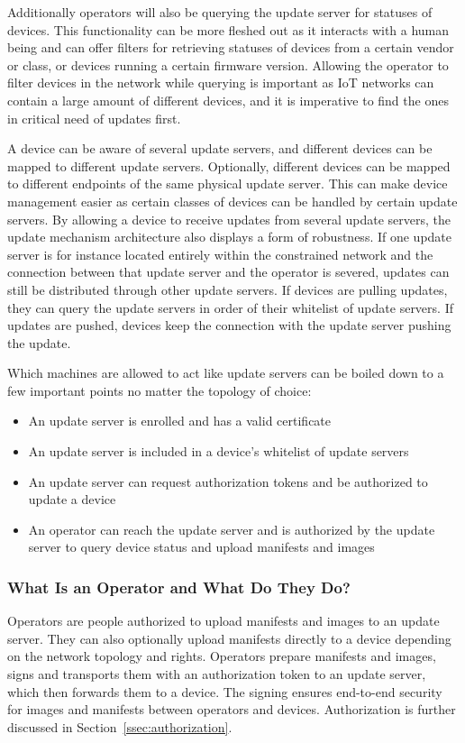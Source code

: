 \documentclass[0-thesis.tex]{subfiles}
\begin{document}
Additionally operators will also be querying the update server for statuses of devices.
This functionality can be more fleshed out as it interacts with a human being and can
offer filters for retrieving statuses of devices from a certain vendor or class, or
devices running a certain firmware version. Allowing the operator to filter devices in the
network while querying is important as IoT networks can contain a large amount of
different devices, and it is imperative to find the ones in critical need of updates
first.

A device can be aware of several update servers, and different devices can be mapped to
different update servers. Optionally, different devices can be mapped to different
endpoints of the same physical update server. This can make device management easier as
certain classes of devices can be handled by certain update servers. By allowing a device
to receive updates from several update servers, the update mechanism architecture also
displays a form of robustness. If one update server is for instance located entirely
within the constrained network and the connection between that update server and the
operator is severed, updates can still be distributed through other update servers. If
devices are pulling updates, they can query the update servers in order of their whitelist
of update servers. If updates are pushed, devices keep the connection with the update
server pushing the update.

Which machines are allowed to act like update servers can be boiled down to a few
important points no matter the topology of choice:

\begin{itemize}
    \item An update server is enrolled and has a valid certificate
    \item An update server is included in a device's whitelist of update servers
    \item An update server can request authorization tokens and be authorized to update a
            device
    \item An operator can reach the update server and is authorized by the update server
            to query device status and upload manifests and images
\end{itemize}

\subsubsection{What Is an Operator and What Do They Do?}
\label{sssec:what-is-an-operator}
Operators are people authorized to upload manifests and images to an update server. They
can also optionally upload manifests directly to a device depending on the network
topology and rights. Operators prepare manifests and images, signs and transports them
with an authorization token to an update server, which then forwards them to a device. The
signing ensures end-to-end security for images and manifests between operators and
devices. Authorization is further discussed in Section~\ref{ssec:authorization}.
\end{document}
